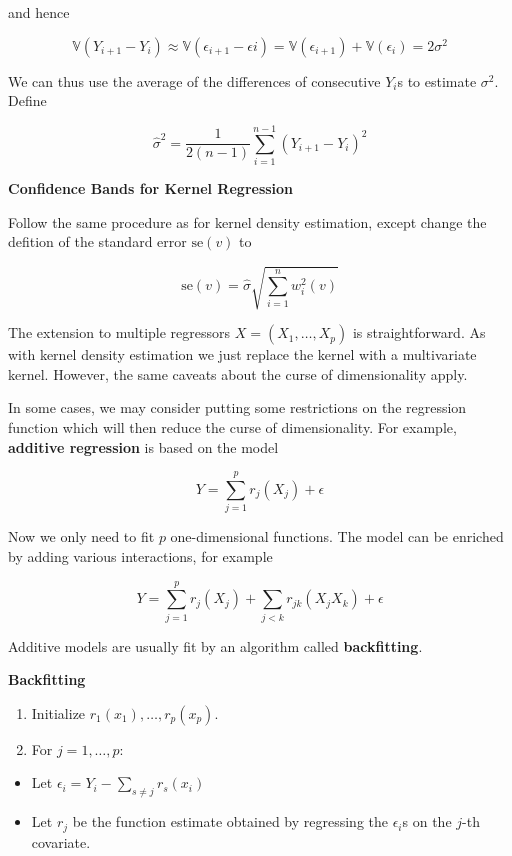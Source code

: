 and hence

\[ \mathbb{V}(Y_{i+1} - Y_{i}) \approx \mathbb{V}(\epsilon_{i+1} - \epsilon{i}) = \mathbb{V}(\epsilon_{i+1}) + \mathbb{V}(\epsilon_{i}) = 2\sigma^{2}\]

We can thus use the average of the differences of consecutive \(Y_{i}\)s
to estimate \(\sigma^{2}\). Define

\[ \hat{\sigma}^{2} = \frac{1}{2(n - 1)} \sum_{i=1}^{n-1} (Y_{i+1} - Y_{i})^{2}\]

\textbf{Confidence Bands for Kernel Regression}

Follow the same procedure as for kernel density estimation, except
change the defition of the standard error \(\text{se}(v)\) to

\[ \text{se}(v) = \hat{\sigma} \sqrt{\sum_{i=1}^{n} w^{2}_{i}(v)} \]

The extension to multiple regressors \(X = (X_{1}, \dots, X_p)\) is
straightforward. As with kernel density estimation we just replace the
kernel with a multivariate kernel. However, the same caveats about the
curse of dimensionality apply.

In some cases, we may consider putting some restrictions on the
regression function which will then reduce the curse of dimensionality.
For example, \textbf{additive regression} is based on the model

\[ Y = \sum_{j=1}^p r_{j}(X_{j}) + \epsilon\]

Now we only need to fit \(p\) one-dimensional functions. The model can
be enriched by adding various interactions, for example

\[ Y = \sum_{j=1}^p r_{j}(X_{j}) + \sum_{j < k} r_{jk}(X_{j} X_{k}) + \epsilon\]

Additive models are usually fit by an algorithm called
\textbf{backfitting}.

\textbf{Backfitting}

\begin{enumerate}[tightlist,label={\arabic*.}]
\item
  Initialize \(r_{1}(x_{1}), \dots, r_p(x_p)\).
\item
  For \(j = 1, \dots, p\):
\end{enumerate}

\begin{itemize}[tightlist]
\item
  Let \(\epsilon_{i} = Y_{i} - \sum_{s \neq j} r_s(x_{i})\)\\
\item
  Let \(r_{j}\) be the function estimate obtained by regressing the
  \(\epsilon_{i}\)s on the \(j\)-th covariate.
\end{itemize}

